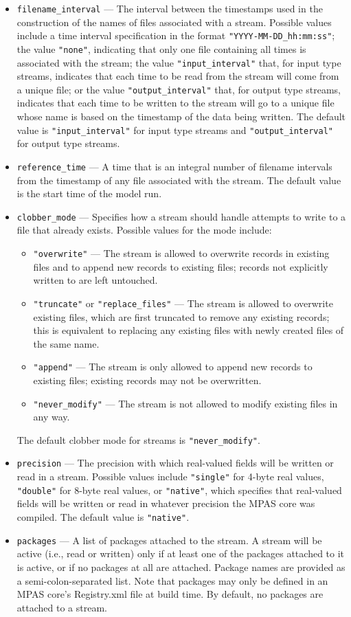 \begin{itemize}
\item {\tt filename\_interval} --- The interval between the timestamps used in the construction of the names of files associated with
a stream. Possible values include a time interval specification in the format {\tt "YYYY-MM-DD\_hh:mm:ss"}; the value {\tt "none"}, indicating
that only one file containing all times is associated with the stream; the value {\tt "input\_interval"} that, for input type streams, indicates that
each time to be read from the stream will come from a unique file; or the value {\tt "output\_interval"} that, for output type streams, indicates 
that each time to be written to the stream will go to a unique file whose name is based on the timestamp of the data being written. The default
value is {\tt "input\_interval"} for input type streams and {\tt "output\_interval"} for output type streams.
\item {\tt reference\_time} --- A time that is an integral number of filename intervals from the timestamp of any file associated with the stream.
The default value is the start time of the model run.
\item {\tt clobber\_mode} --- Specifies how a stream should handle attempts to write to a file that already exists. Possible values
for the mode include:
\begin{itemize}
\item {\tt "overwrite"} --- The stream is allowed to overwrite records in existing files and to append new records 
to existing files; records not explicitly written to are left untouched.
\item {\tt "truncate"} or {\tt "replace\_files"} --- The stream is allowed to overwrite existing files, which are first truncated 
to remove any existing records; this is equivalent to replacing any existing files with newly created files of the same name.
\item {\tt "append"} --- The stream is only allowed to append new records to existing files; existing records may not be overwritten.
\item {\tt "never\_modify"} --- The stream is not allowed to modify existing files in any way.
\end{itemize}
The default clobber mode for streams is {\tt "never\_modify"}.
\item {\tt precision} --- The precision with which real-valued fields will be written or read in a stream. Possible values include 
{\tt "single"} for 4-byte real values, {\tt "double"} for 8-byte real values, or {\tt "native"}, which specifies that real-valued fields
will be written or read in whatever precision the MPAS core was compiled. The default value is {\tt "native"}.
\item {\tt packages} --- A list of packages attached to the stream. A stream will be active (i.e., read or written) only if at least one of 
the packages attached to it is active, or if no packages at all are attached. Package names are provided as a semi-colon-separated
list. Note that packages may only be defined in an MPAS core's Registry.xml file at build time. By default, no packages are attached
to a stream.
\end{itemize}

